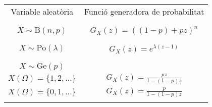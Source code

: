 \documentclass{article}
\begin{document}
\begin{center}
\begin{tabular}{|c|c|}
\hline
Variable aleat\`oria & Funci\'o generadora de probabilitat  \\ &  \\ \hline  & \\
$X \sim \mathrm{B}(n, p)$ & $G_X(z)=((1-p)+pz)^n$  \\  & \\ \hline  &\\ 
$X \sim \mathrm{Po}(\lambda)$ & $G_X(z)=e^{\lambda(z-1)}$ \\ & \\ \hline  &\\ 
$X \sim \mathrm{Ge}(p)$ &    \\
$X(\Omega)=\{1, 2, \dots \}$ & $G_X(z)=\frac{pz}{1-(1-p)z}$ \\ 
$X(\Omega)=\{0, 1, \dots \}$ & $G_X(z)=\frac{p}{1-(1-p)z}$\\  & \\ \hline
\end{tabular}
\end{center}
\end{document}

